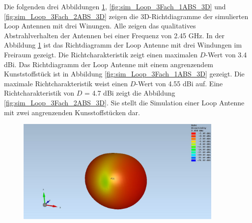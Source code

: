 \newpage
\clearpage
Die folgenden drei Abbildungen \ref{fig:sim_Loop_3Fach_freiraum_3D}, \ref{fig:sim_Loop_3Fach_1ABS_3D} und \ref{fig:sim_Loop_3Fach_2ABS_3D} zeigen die 3D-Richtdiagramme der simulierten Loop Antennen mit drei Winungen. Alle zeigen das qualitatives Abstrahlverhalten der Antennen bei einer Frequenz von 2.45 GHz. In der Abbildung \ref{fig:sim_Loop_3Fach_freiraum_3D} ist das Richtdiagramm der Loop Antenne mit drei Windungen im Freiraum gezeigt. Die Richtcharakteristik zeigt einen maximalen $D$-Wert von 3.4 dBi. Das Richtdiagramm der Loop Antenne mit einem angrenzendem Kunststoffstück ist in Abbildung \ref{fig:sim_Loop_3Fach_1ABS_3D} gezeigt. Die maximale Richtcharakteristik weist einen $D$-Wert von 4.55 dBi auf. Eine Richtcharakteristik von $D$ = 4.7 dBi zeigt die Abbildung \ref{fig:sim_Loop_3Fach_2ABS_3D}. Sie stellt die Simulation einer Loop Antenne mit zwei angrenzenden Kunsstoffstücken dar.
\begin{figure}[h]
	\begin{center}
		\includegraphics[width=0.9\textwidth]{content/bilder/Evaluation/Loop/ohneABS/EM_Far_Field_Loop_Coil_ohneABS.JPG}
		\label{fig:sim_Loop_3Fach_freiraum_3D}
	\end{center}
\end{figure}
